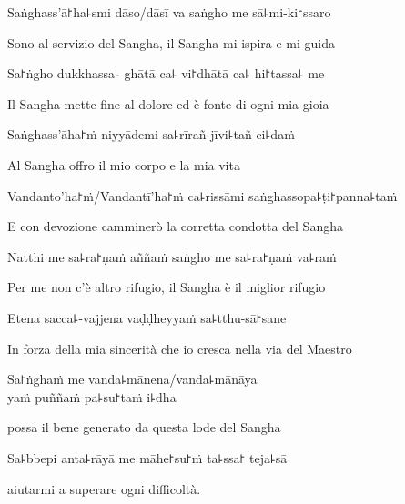 Saṅghass'ā꜓ha꜕smi dāso/dāsī va saṅgho me sā꜕mi-ki꜓ssaro\\
\begin{english}
Sono al servizio del Sangha, il Sangha mi ispira e mi guida\\
\end{english} 

Sa꜓ṅgho dukkhassa꜕ ghātā ca꜕ vi꜓dhātā ca꜕ hi꜓tassa꜕ me\\
\begin{english}
Il Sangha mette fine al dolore ed è fonte di ogni mia gioia\\
\end{english}

Saṅghass'āha꜓ṁ niyyādemi sa꜕rīrañ-jīvi꜕tañ-ci꜕daṁ\\
\begin{english}
Al Sangha offro il mio corpo e la mia vita\\
\end{english}

Vandanto'ha꜓ṁ/Vandantī'ha꜓ṁ ca꜕rissāmi saṅghassopa꜕ṭi꜓panna꜕taṁ\\
\begin{english}
E con devozione camminerò la corretta condotta del Sangha\\
\end{english}

Natthi me sa꜕ra꜓ṇaṁ aññaṁ saṅgho me sa꜕ra꜓ṇaṁ va꜕raṁ\\
\begin{english}
Per me non c'è altro rifugio, il Sangha è il miglior rifugio\\
\end{english}

Etena sacca꜕-vajjena vaḍḍheyyaṁ sa꜕tthu-sā꜓sane\\
\begin{english}
In forza della mia sincerità che io cresca nella via del Maestro\\
\end{english}

Sa꜓ṅghaṁ me vanda꜕mānena/vanda꜕mānāya\\
\vin yaṁ puññaṁ pa꜕su꜓taṁ i꜕dha\\
\begin{english}
 possa il bene generato da questa lode del Sangha \\
\end{english}


Sa꜕bbepi anta꜕rāyā me māhe꜓su꜓ṁ ta꜕ssa꜓ teja꜕sā
\begin{english}
  aiutarmi a superare ogni difficoltà.
\end{english}

